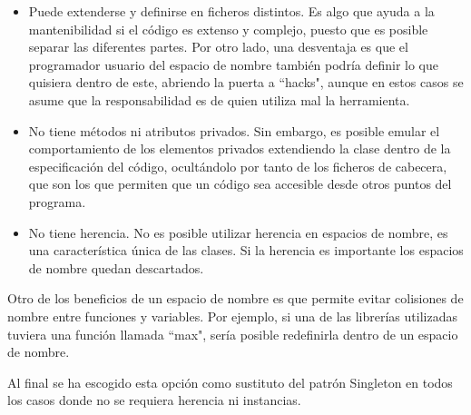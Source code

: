 \begin{itemize}
    \item Puede extenderse y definirse en ficheros distintos. Es algo que ayuda a la mantenibilidad si el código es extenso y complejo, puesto que es posible separar las diferentes partes. Por otro lado, una desventaja es que el programador usuario del espacio de nombre también podría definir lo que quisiera dentro de este, abriendo la puerta a ``hacks", aunque en estos casos se asume que la responsabilidad es de quien utiliza mal la herramienta.
    
    \item No tiene métodos ni atributos privados. Sin embargo, es posible emular el comportamiento de los elementos privados extendiendo la clase dentro de la especificación del código, ocultándolo por tanto de los ficheros de cabecera, que son los que permiten que un código sea accesible desde otros puntos del programa.
    
    \item No tiene herencia. No es posible utilizar herencia en espacios de nombre, es una característica única de las clases. Si la herencia es importante los espacios de nombre quedan descartados.
\end{itemize}

Otro de los beneficios de un espacio de nombre es que permite evitar colisiones de nombre entre funciones y variables. Por ejemplo, si una de las librerías utilizadas tuviera una función llamada ``max", sería posible redefinirla dentro de un espacio de nombre.

Al final se ha escogido esta opción como sustituto del patrón Singleton en todos los casos donde no se requiera herencia ni instancias.

